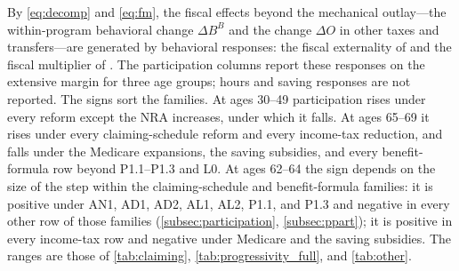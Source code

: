By \eqref{eq:decomp} and \eqref{eq:fm}, the fiscal effects beyond the mechanical outlay---the within-program behavioral change $\Delta B^{B}$ and the change $\Delta O$ in other taxes and transfers---are generated by behavioral responses: the fiscal externality of \citet{chetty2009sufficient} and the fiscal multiplier of \citet{haller2022welfare}. The participation columns report these responses on the extensive margin for three age groups; hours and saving responses are not reported. The signs sort the families. At ages 30--49 participation rises under every reform except the NRA increases, under which it falls. %
At ages 65--69 it rises under every claiming-schedule reform and every income-tax reduction, and falls under the Medicare expansions, the saving subsidies, and every benefit-formula row beyond P1.1--P1.3 and L0. %
At ages 62--64 the sign depends on the size of the step within the claiming-schedule and benefit-formula families: it is positive under AN1, AD1, AD2, AL1, AL2, P1.1, and P1.3 and negative in every other row of those families (\autoref{subsec:participation}, \autoref{subsec:ppart}); it is positive in every income-tax row and negative under Medicare and the saving subsidies. The ranges are those of \autoref{tab:claiming}, \autoref{tab:progressivity_full}, and \autoref{tab:other}. %

